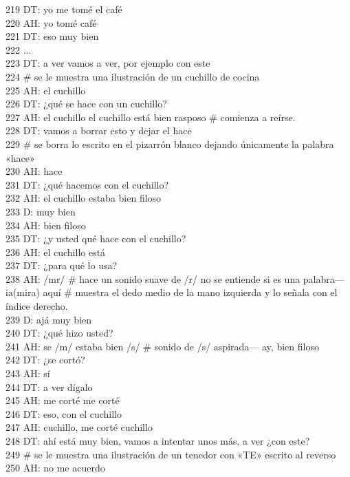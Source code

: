 219 DT: yo me tomé el café\\
220 AH: yo tomé café\\
221 DT: eso muy bien\\
222 ...\\
223 DT: a ver vamos a ver, por ejemplo con este\\
224 \# se le muestra una ilustración de un cuchillo de cocina\\
225 AH: el cuchillo\\
226 DT: ¿qué se hace con un cuchillo?\\
227 AH: el cuchillo el cuchillo está bien rasposo \# comienza a reírse.\\
228 DT: vamos a borrar esto y dejar el hace\\
229 \# se borra lo escrito en el pizarrón blanco dejando únicamente la palabra «hace»\\
230 AH: hace\\
231 DT: ¿qué hacemos con el cuchillo?\\
232 AH: el cuchillo estaba bien filoso\\
233 D: muy bien\\
234 AH: bien filoso\\
235 DT: ¿y usted qué hace con el cuchillo?\\
236 AH: el cuchillo está\\
237 DT: ¿para qué lo usa?\\
238 AH: /mr/ \# hace un sonido suave de /r/ no se entiende si es una palabra--- ia(mira) aquí \# muestra el dedo medio de la mano izquierda y lo señala con el índice derecho.\\
239 D: ajá muy bien\\
240 DT: ¿qué hizo usted?\\
241 AH: se /m/ estaba bien /s/ \# sonido de /s/ aspirada--- ay, bien filoso\\
242 DT: ¿se cortó?\\
243 AH: sí\\
244 DT: a ver dígalo\\
245 AH: me corté me corté\\
246 DT: eso, con el cuchillo\\
247 AH: cuchillo, me corté cuchillo\\
248 DT: ahí está muy bien, vamos a intentar unos más, a ver ¿con este?\\
249 \# se le muestra una ilustración de un tenedor con «TE» escrito al reverso\\
250 AH: no me acuerdo\\
